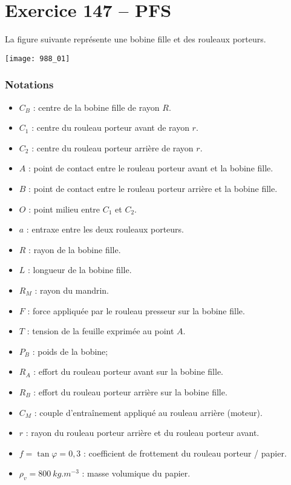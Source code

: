 \section*{Exercice 147 -- PFS}
\setcounter{exo}{0}


La figure suivante représente une bobine fille et des rouleaux porteurs.


\begin{center}
\texttt{[image: 988\_01]}%
\end{center}

\subsubsection*{Notations}
\begin{itemize}
\item $C_B$ : centre de la bobine fille de rayon $R$.
\item $C_1$ : centre du rouleau porteur avant de rayon $r$.
\item $C_2$ : centre du rouleau porteur arrière de rayon $r$.
\item $A$ : point de contact entre le rouleau porteur avant et la bobine fille.
\item $B$ : point de contact entre le rouleau porteur arrière et la bobine fille.
\item $O$ : point milieu entre $C_1$ et $C_2$.
\item $a$ : entraxe entre les deux rouleaux porteurs.
\item $R$ : rayon de la bobine fille.
\item $L$ : longueur de la bobine fille.
\item $R_M$ : rayon du mandrin.
\item $F$ : force appliquée par le rouleau presseur sur la bobine fille. 
\item $T$ : tension de la feuille exprimée au point $A$.
\item $P_B$ : poids de la bobine;
\item $R_A$ : effort du rouleau porteur avant sur la bobine fille.  
\item $R_B$ : effort du rouleau porteur arrière sur la bobine fille.
\item $C_M$ : couple d’entraînement appliqué au rouleau arrière (moteur).
\item $r$ : rayon du rouleau porteur arrière et du rouleau porteur avant. 
\item $f=\tan\varphi = 0,3$ : coefficient de frottement du rouleau porteur / papier.  
\item $\rho_v = \SI{800}{kg.m^{-3}}$ : masse volumique du papier.
\end{itemize}

